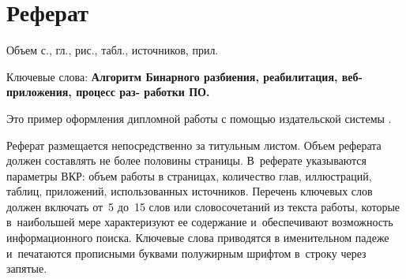 \documentclass[a4paper,12pt]{diplom}
\begin{document}










\maketitle
\chapter{Реферат}

Объем  с.,  гл.,  рис.,
 табл.,  источников,  прил.

\medskip

Ключевые слова: \textbf{Алгоритм Бинарного разбиения, реабилитация, веб-приложения, процесс раз-
работки ПО.}

\medskip

Это пример оформления дипломной работы с помощью издательской системы \LaTeXe.

Реферат размещается непосредственно за титульным листом. Объем реферата должен составлять не более половины страницы. В~реферате указываются параметры ВКР: объем работы в страницах, количество глав, иллюстраций, таблиц, приложений, использованных источников. Перечень ключевых слов должен включать от~5 до~15 слов или словосочетаний из текста работы, которые в~наибольшей мере характеризуют ее содержание и~обеспечивают возможность информационного поиска. Ключевые слова приводятся в именительном падеже и~печатаются прописными буквами полужирным шрифтом в~строку через запятые.
\end{document}
